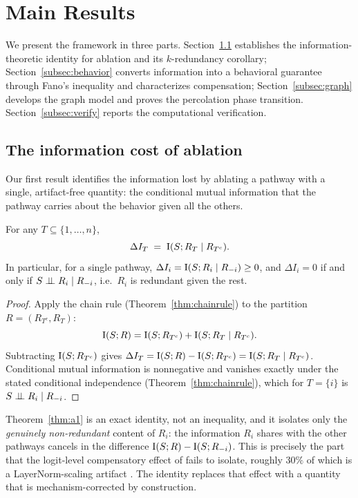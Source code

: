 \section{Main Results}
\label{sec:results}

We present the framework in three parts. Section~\ref{subsec:info} establishes the
information-theoretic identity for ablation and its $k$-redundancy corollary;
Section~\ref{subsec:behavior} converts information into a behavioral guarantee through
Fano's inequality and characterizes compensation; Section~\ref{subsec:graph} develops
the graph model and proves the percolation phase transition. Section~\ref{subsec:verify}
reports the computational verification.

\subsection{The information cost of ablation}
\label{subsec:info}

Our first result identifies the information lost by ablating a pathway with a single,
artifact-free quantity: the conditional mutual information that the pathway carries
about the behavior given all the others.

\begin{theorem}
\label{thm:a1}
For any $T\subseteq\{1,\dots,n\}$,
\[
  \Delta I_T \;=\; \operatorname{I}(S;R_T\mid R_{T^c}).
\]
In particular, for a single pathway,
$\Delta I_i=\operatorname{I}(S;R_i\mid R_{-i})\ge 0$, and $\Delta I_i=0$ if and only if
$S\perp\!\!\!\perp R_i\mid R_{-i}$, i.e.\ $R_i$ is redundant given the rest.
\end{theorem}

\begin{proof}
Apply the chain rule (Theorem~\ref{thm:chainrule}) to the partition
$R=(R_{T^c},R_T)$:
\[
  \operatorname{I}(S;R)=\operatorname{I}(S;R_{T^c})+\operatorname{I}(S;R_T\mid R_{T^c}).
\]
Subtracting $\operatorname{I}(S;R_{T^c})$ gives
$\Delta I_T=\operatorname{I}(S;R)-\operatorname{I}(S;R_{T^c})=\operatorname{I}(S;R_T\mid R_{T^c})$. Conditional mutual
information is nonnegative and vanishes exactly under the stated conditional
independence (Theorem~\ref{thm:chainrule}), which for $T=\{i\}$ is $S\perp\!\!\!\perp R_i\mid
R_{-i}$.
\end{proof}

\begin{remark}
Theorem~\ref{thm:a1} is an exact identity, not an inequality, and it isolates only the
\emph{genuinely non-redundant} content of $R_i$: the information $R_i$ shares with the
other pathways cancels in the difference $\operatorname{I}(S;R)-\operatorname{I}(S;R_{-i})$. This is precisely
the part that the logit-level compensatory effect of \cite{mcgrath2023hydra} fails to
isolate, roughly $30\%$ of which is a LayerNorm-scaling artifact
\cite{rushing2024selfrepair}. The identity replaces that effect with a quantity that
is mechanism-corrected by construction.
\end{remark}

